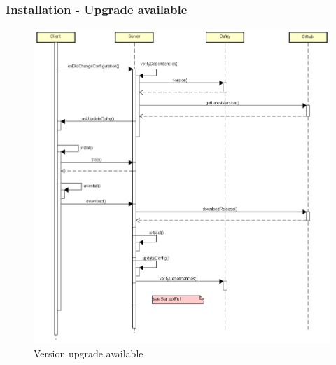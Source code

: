 \subsubsection{Installation - Upgrade available}
\begin{figure}[H]
	\centering
	\includegraphics[width=1\textwidth]{img/DafnyVersionUpgrade}
	\caption{Version upgrade available}
	\label{fig:Version upgrade available}
\end{figure}



